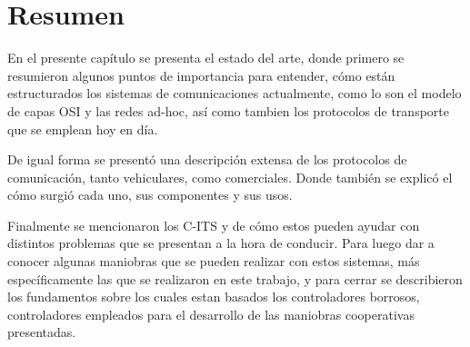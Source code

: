 \section{Resumen}

En el presente capítulo se presenta el estado del arte, donde primero se resumieron algunos puntos de importancia para entender, cómo están estructurados los sistemas de comunicaciones actualmente, como lo son el modelo de capas OSI y las redes ad-hoc, así como tambien los protocolos de transporte que se emplean hoy en día.\\

\par De igual forma se presentó una descripción extensa de los protocolos de comunicación, tanto vehiculares, como comerciales. Donde también se explicó el cómo surgió cada uno, sus componentes y sus usos.\\

\par Finalmente se mencionaron los C-ITS y de cómo estos pueden ayudar con distintos problemas que se presentan a la hora de conducir. Para luego dar a conocer algunas maniobras que se pueden realizar con estos sistemas, más específicamente las que se realizaron en este trabajo, y para cerrar se describieron los fundamentos sobre los cuales estan basados los controladores borrosos, controladores empleados para el desarrollo de las maniobras cooperativas presentadas.      






